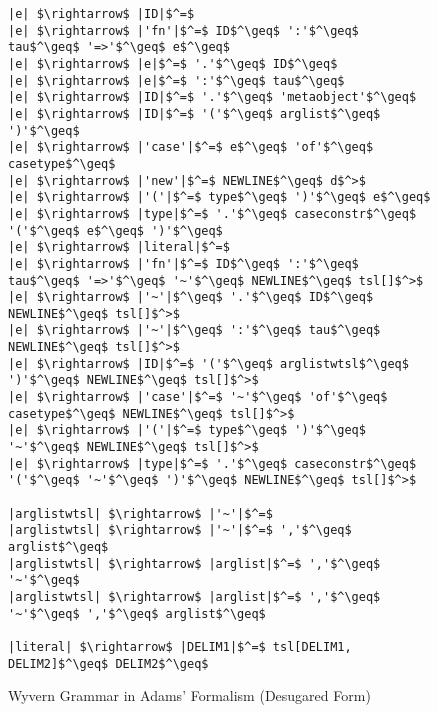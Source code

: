 
\begin{figure}
\begin{lstlisting}[mathescape]
|e| $\rightarrow$ |ID|$^=$
|e| $\rightarrow$ |'fn'|$^=$ ID$^\geq$ ':'$^\geq$ tau$^\geq$ '=>'$^\geq$ e$^\geq$
|e| $\rightarrow$ |e|$^=$ '.'$^\geq$ ID$^\geq$
|e| $\rightarrow$ |e|$^=$ ':'$^\geq$ tau$^\geq$
|e| $\rightarrow$ |ID|$^=$ '.'$^\geq$ 'metaobject'$^\geq$
|e| $\rightarrow$ |ID|$^=$ '('$^\geq$ arglist$^\geq$ ')'$^\geq$
|e| $\rightarrow$ |'case'|$^=$ e$^\geq$ 'of'$^\geq$ casetype$^\geq$
|e| $\rightarrow$ |'new'|$^=$ NEWLINE$^\geq$ d$^>$
|e| $\rightarrow$ |'('|$^=$ type$^\geq$ ')'$^\geq$ e$^\geq$
|e| $\rightarrow$ |type|$^=$ '.'$^\geq$ caseconstr$^\geq$ '('$^\geq$ e$^\geq$ ')'$^\geq$
|e| $\rightarrow$ |literal|$^=$
|e| $\rightarrow$ |'fn'|$^=$ ID$^\geq$ ':'$^\geq$ tau$^\geq$ '=>'$^\geq$ '~'$^\geq$ NEWLINE$^\geq$ tsl[]$^>$
|e| $\rightarrow$ |'~'|$^\geq$ '.'$^\geq$ ID$^\geq$ NEWLINE$^\geq$ tsl[]$^>$
|e| $\rightarrow$ |'~'|$^\geq$ ':'$^\geq$ tau$^\geq$ NEWLINE$^\geq$ tsl[]$^>$
|e| $\rightarrow$ |ID|$^=$ '('$^\geq$ arglistwtsl$^\geq$ ')'$^\geq$ NEWLINE$^\geq$ tsl[]$^>$
|e| $\rightarrow$ |'case'|$^=$ '~'$^\geq$ 'of'$^\geq$ casetype$^\geq$ NEWLINE$^\geq$ tsl[]$^>$
|e| $\rightarrow$ |'('|$^=$ type$^\geq$ ')'$^\geq$ '~'$^\geq$ NEWLINE$^\geq$ tsl[]$^>$
|e| $\rightarrow$ |type|$^=$ '.'$^\geq$ caseconstr$^\geq$ '('$^\geq$ '~'$^\geq$ ')'$^\geq$ NEWLINE$^\geq$ tsl[]$^>$

|arglistwtsl| $\rightarrow$ |'~'|$^=$
|arglistwtsl| $\rightarrow$ |'~'|$^=$ ','$^\geq$ arglist$^\geq$
|arglistwtsl| $\rightarrow$ |arglist|$^=$ ','$^\geq$ '~'$^\geq$
|arglistwtsl| $\rightarrow$ |arglist|$^=$ ','$^\geq$ '~'$^\geq$ ','$^\geq$ arglist$^\geq$

|literal| $\rightarrow$ |DELIM1|$^=$ tsl[DELIM1, DELIM2]$^\geq$ DELIM2$^\geq$
\end{lstlisting}
\caption{Wyvern Grammar in Adams' Formalism (Desugared Form)}
\label{f-grammar}
\end{figure}


